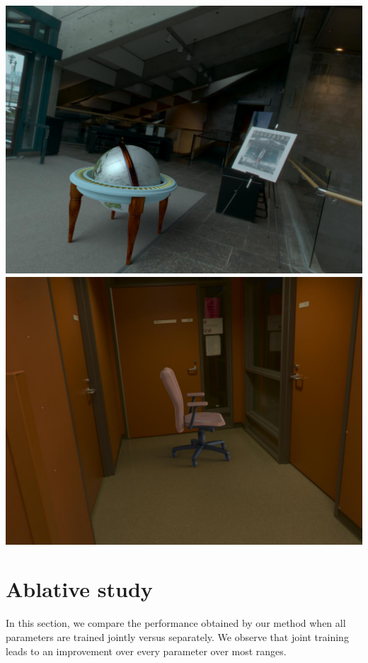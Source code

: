 \begin{multicols}{3}
\includegraphics[width=\linewidth]{virtual_object_insertions/scene156_compose2.jpg}\vspace{1em}
\includegraphics[width=\linewidth]{virtual_object_insertions/scene27_compose.jpg}\vspace{1em}
\end{multicols}


\protect\hypertarget{ablative}{}{}

\hypertarget{ablative-study}{%
\section{Ablative study}\label{ablative-study}}

In this section, we compare the performance obtained by our method when all parameters are trained jointly versus separately. We observe that joint training leads to an improvement over every parameter over most ranges.


